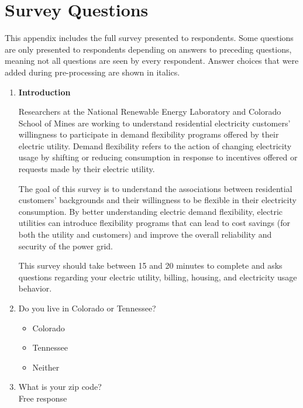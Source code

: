 \documentclass{article}
\begin{document}
\section{Survey Questions}\label{survey}
This appendix includes the full survey presented to respondents. Some questions are only presented to respondents depending on answers to preceding questions, meaning not all questions are seen by every respondent. Answer choices that were added during pre-processing are shown in italics.

\newcommand{\checkbox}{$\square$\ }
 
 
\begin{enumerate}
 

\item \textbf{Introduction}

Researchers at the National Renewable Energy Laboratory and Colorado School of Mines are working to understand residential electricity customers' willingness to participate in demand flexibility programs offered by their electric utility. Demand flexibility refers to the action of changing electricity usage by shifting or reducing consumption in response to incentives offered or requests made by their electric utility.
 
The goal of this survey is to understand the associations between residential customers' backgrounds and their willingness to be flexible in their electricity consumption. By better understanding electric demand flexibility, electric utilities can introduce flexibility programs that can lead to cost savings (for both the utility and customers) and improve the overall reliability and security of the power grid.
 
This survey should take between 15 and 20 minutes to complete and asks questions regarding your electric utility, billing, housing, and electricity usage behavior.
 

\item Do you live in Colorado or Tennessee?
\begin{itemize}
  \item[\checkbox] Colorado
  \item[\checkbox] Tennessee
  \item[\checkbox] Neither
\end{itemize}
 

\item What is your zip code?\\
Free response
 


\end{enumerate}
\end{document}

